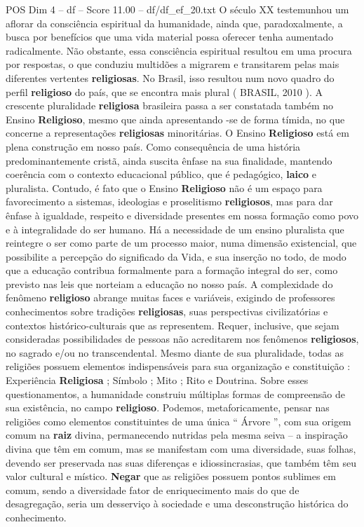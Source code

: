 \begin{textsample}{POS Dim 4 – df – Score 11.00 – df/df\_ef\_20.txt}
O século XX testemunhou um aflorar da consciência espiritual da humanidade, ainda que, paradoxalmente, a busca por benefícios que uma vida material possa oferecer tenha aumentado radicalmente.
Não obstante, essa consciência espiritual resultou em uma procura por respostas, o que conduziu multidões a migrarem e transitarem pelas mais diferentes vertentes \textbf{religiosas}.
No Brasil, isso resultou num novo quadro do perfil \textbf{religioso} do país, que se encontra mais plural ( BRASIL, 2010 ).
A crescente pluralidade \textbf{religiosa} brasileira passa a ser constatada também no Ensino \textbf{Religioso}, mesmo que ainda apresentando -se de forma tímida, no que concerne a representações \textbf{religiosas} minoritárias.
O Ensino \textbf{Religioso} está em plena construção em nosso país.
Como consequência de uma história predominantemente cristã, ainda suscita ênfase na sua finalidade, mantendo coerência com o contexto educacional público, que é pedagógico, \textbf{laico} e pluralista.
Contudo, é fato que o Ensino \textbf{Religioso} não é um espaço para favorecimento a sistemas, ideologias e proselitismo \textbf{religiosos}, mas para dar ênfase à igualdade, respeito e diversidade presentes em nossa formação como povo e à integralidade do ser humano.
Há a necessidade de um ensino pluralista que reintegre o ser como parte de um processo maior, numa dimensão existencial, que possibilite a percepção do significado da Vida, e sua inserção no todo, de modo que a educação contribua formalmente para a formação integral do ser, como previsto nas leis que norteiam a educação no nosso país.
A complexidade do fenômeno \textbf{religioso} abrange muitas faces e variáveis, exigindo de professores conhecimentos sobre tradições \textbf{religiosas}, suas perspectivas civilizatórias e contextos histórico-culturais que as representem.
Requer, inclusive, que sejam consideradas possibilidades de pessoas não acreditarem nos fenômenos \textbf{religiosos}, no sagrado e/ou no transcendental.
Mesmo diante de sua pluralidade, todas as religiões possuem elementos indispensáveis para sua organização e constituição : Experiência \textbf{Religiosa} ; Símbolo ; Mito ; Rito e Doutrina.
Sobre esses questionamentos, a humanidade construiu múltiplas formas de compreensão de sua existência, no campo \textbf{religioso}.
Podemos, metaforicamente, pensar nas religiões como elementos constituintes de uma única “ Árvore ”, com sua origem comum na \textbf{raiz} divina, permanecendo nutridas pela mesma seiva – a inspiração divina que têm em comum, mas se manifestam com uma diversidade, suas folhas, devendo ser preservada nas suas diferenças e idiossincrasias, que também têm seu valor cultural e místico. \textbf{Negar} que as religiões possuem pontos sublimes em comum, sendo a diversidade fator de enriquecimento mais do que de desagregação, seria um desserviço à sociedade e uma desconstrução histórica do conhecimento.

\end{textsample}
